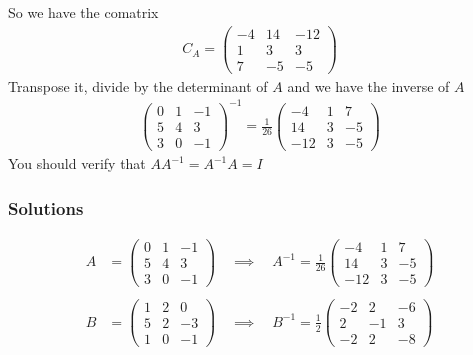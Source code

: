 \documentclass[usenames,dvipsnames,aspectratio=169,10pt]{beamer}
\numberwithin{equation}{section}
\begin{document}
\begin{frame}
So we have the comatrix
\begin{align*}
C_A = 
\begin{pmatrix}
 -4 & 14 & -12 \\
  1 &  3 &   3 \\
  7 & -5 &  -5
\end{pmatrix}
\end{align*}
Transpose it, divide by the determinant of $A$ and we have the inverse of $A$
\begin{align*}
\begin{pmatrix}
  0 & 1 & -1 \\
  5 & 4 &  3 \\
  3 & 0 & -1
\end{pmatrix}^{-1}
=
\frac{1}{26}
\begin{pmatrix}
  -4 &  1 &  7 \\
  14 &  3 & -5 \\
 -12 &  3 & -5
\end{pmatrix}
\end{align*}
You should verify that $AA^{-1}=A^{-1}A=I$
\end{frame}




\begin{frame}
\frametitle{Solutions}

\begin{align*}
A&=
\begin{pmatrix}
  0 & 1 & -1 \\
  5 & 4 &  3 \\
  3 & 0 & -1
\end{pmatrix}
\quad\implies\quad
A^{-1}
=
\frac{1}{26}
\begin{pmatrix}
  -4 &  1 &  7 \\
  14 &  3 & -5 \\
 -12 &  3 & -5
\end{pmatrix}
\\ \\
B&=
\begin{pmatrix}
  1 & 2 &  0 \\
  5 & 2 & -3 \\
  1 & 0 & -1
\end{pmatrix}
\quad\implies\quad
B^{-1}
=
\frac{1}{2}
\begin{pmatrix}
  -2 &  2 & -6 \\
   2 & -1 &  3 \\
  -2 &  2 & -8
\end{pmatrix}
\end{align*}
\end{frame}
\fi
\end{document}
